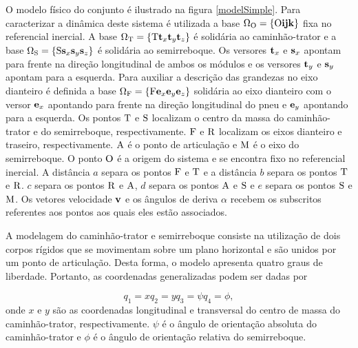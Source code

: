 \documentclass[sublist]{fei}
\begin{document}
O modelo físico do conjunto é ilustrado na figura \ref{modelSimple}. Para caracterizar a dinâmica deste sistema é utilizada a base \( \Omega_{\rm O} = \{ {\rm O} {\bf i} {\bf j} {\bf k} \}\) fixa no referencial inercial. A base \( \Omega_{\rm T} = \{ {\rm T} {\bf t}_x {\bf t}_y {\bf t}_z \}\) é solidária ao caminhão-trator e a base \( \Omega_{\rm S} = \{ {\rm S} {\bf s}_x {\bf s}_y {\bf s}_z \}\) é solidária ao semirreboque. Os versores \({\bf t}_x\) e \({\bf s}_x\) apontam para frente na direção longitudinal de ambos os módulos e os versores \({\bf t}_y\) e \({\bf s}_y\) apontam para a esquerda. Para auxiliar a descrição das grandezas no eixo dianteiro é definida a base \( \Omega_{\rm F} = \{ {\rm F} {\bf e}_x {\bf e}_y {\bf e}_z \}\) solidária ao eixo dianteiro com o versor \({\bf e}_x\) apontando para frente na direção longitudinal do pneu e \({\bf e}_y\) apontando para a esquerda. Os pontos \({\rm T}\) e \({\rm S}\) localizam o centro da massa do caminhão-trator e do semirreboque, respectivamente. \({\rm F}\) e \({\rm R}\) localizam os eixos dianteiro e traseiro, respectivamente. \({\rm A}\) é o ponto de articulação e \({\rm M}\) é o eixo do semirreboque. O ponto \({\rm O}\) é a origem do sistema e se encontra fixo no referencial inercial. A distância \(a\) separa os pontos \({\rm F}\) e \({\rm T}\) e a distância \(b\) separa os pontos \({\rm T}\) e \({\rm R}\). \(c\) separa os pontos \({\rm R}\) e \({\rm A}\), \(d\) separa os pontos \({\rm A}\) e \({\rm S}\) e \(e\) separa os pontos \({\rm S}\) e \({\rm M}\). Os vetores velocidade \({\bf v}\) e os ângulos de deriva \(\alpha\) recebem os subscritos referentes aos pontos aos quais eles estão associados.

A modelagem do caminhão-trator e semirreboque consiste na utilização de dois corpos rígidos que se movimentam sobre um plano horizontal e são unidos por um ponto de articulação. Desta forma, o modelo apresenta quatro graus de liberdade. Portanto, as coordenadas generalizadas podem ser dadas por

\begin{subequations}
\begin{equation}
    q_1 = x
\end{equation}
\begin{equation}
    q_2 = y
\end{equation}
\begin{equation}
    q_3 = \psi
\end{equation}
\begin{equation}
    q_4 = \phi,
\end{equation}
\end{subequations}
onde \(x\) e \(y\) são as coordenadas longitudinal e transversal do centro de massa do caminhão-trator, respectivamente. \(\psi\) é o ângulo de orientação absoluta do caminhão-trator e \(\phi\) é o ângulo de orientação relativa do semirreboque.
\end{document}

